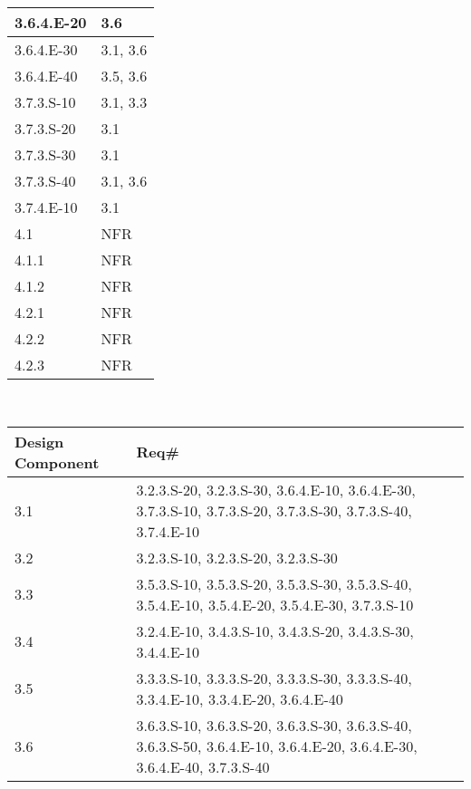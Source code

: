 \begin{center}
\begin{tabular}{| l || l | }
3.6.4.E-20 & 3.6  \\ \hline
3.6.4.E-30 & 3.1, 3.6  \\ \hline
3.6.4.E-40 & 3.5, 3.6  \\ \hline
3.7.3.S-10 & 3.1, 3.3  \\ \hline
3.7.3.S-20 & 3.1  \\ \hline
3.7.3.S-30 & 3.1  \\ \hline
3.7.3.S-40 & 3.1, 3.6  \\ \hline
3.7.4.E-10 & 3.1  \\ \hline
4.1 & NFR  \\ \hline
4.1.1 & NFR  \\ \hline
4.1.2 & NFR  \\ \hline
4.2.1 & NFR  \\ \hline
4.2.2 & NFR  \\ \hline
4.2.3 & NFR  \\ \hline \hline
\end{tabular} \\
\end{center}
\clearpage
\begin{center}
\begin{tabular}{| l || p{8cm} | }
\hline

Design Component & Req\# \\ \hline \hline
3.1 &  3.2.3.S-20, 3.2.3.S-30, 3.6.4.E-10, 3.6.4.E-30, 3.7.3.S-10, 3.7.3.S-20, 3.7.3.S-30, 3.7.3.S-40, 3.7.4.E-10  \\ \hline
3.2 &  3.2.3.S-10, 3.2.3.S-20, 3.2.3.S-30 \\ \hline
3.3 &  3.5.3.S-10, 3.5.3.S-20, 3.5.3.S-30, 3.5.3.S-40, 3.5.4.E-10, 3.5.4.E-20, 3.5.4.E-30, 3.7.3.S-10  \\ \hline
3.4 &  3.2.4.E-10, 3.4.3.S-10, 3.4.3.S-20, 3.4.3.S-30, 3.4.4.E-10  \\ \hline
3.5 &  3.3.3.S-10, 3.3.3.S-20, 3.3.3.S-30, 3.3.3.S-40, 3.3.4.E-10, 3.3.4.E-20, 3.6.4.E-40  \\ \hline
3.6 &  3.6.3.S-10, 3.6.3.S-20, 3.6.3.S-30, 3.6.3.S-40, 3.6.3.S-50, 3.6.4.E-10, 3.6.4.E-20, 3.6.4.E-30, 3.6.4.E-40, 3.7.3.S-40  \\ \hline


\end{tabular}
\end{center}
